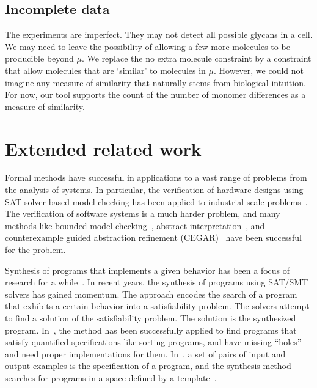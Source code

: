 \documentclass{llncs}
\begin{document}
\subsection{Incomplete data}

The experiments are imperfect. They may not detect all possible glycans
in a cell.
We may need to leave the possibility of allowing a few more molecules to be
producible beyond $\mu$.
We replace the no extra molecule constraint by a constraint that allow molecules
that are `similar' to molecules in $\mu$.
However, we could not imagine any measure of similarity that naturally stems from
biological intuition.
For now, our tool supports the count of the number of monomer differences
as a measure of similarity.



\section{Extended related work}


Formal methods have successful in applications to a vast range of
problems from the analysis of systems.
%
In particular,
the verification of hardware designs
using SAT solver based model-checking has been applied
to industrial-scale problems~\cite{biere1999symbolic2}.
%
The verification of software systems is a much harder problem, and
many methods like bounded model-checking~\cite{biere2003bounded},
abstract interpretation~\cite{lattice77}, and
counterexample guided abstraction refinement (CEGAR)~\cite{ClarkeCEGAR} have
been successful for the problem.
%

Synthesis of programs that implements a given behavior
has been a focus of research for a while~\cite{PnueliSynthesis}.
%
In recent years, the synthesis of programs using SAT/SMT solvers
has gained momentum.
%
The approach encodes the search of a program that exhibits a certain
behavior into a satisfiability problem.
%
The solvers attempt to find a solution of the satisfiability problem.
%
The solution is the synthesized program.
%
In~\cite{SrivastavaSynthesis,Solar-Lezama2005},
the method has been successfully applied
to find programs that satisfy quantified specifications like sorting
programs, and have missing ``holes'' and need proper implementations
for them.
%
In~\cite{exampleSynth},
a set of pairs of input and output examples is the specification of a program,
and the synthesis method searches for programs in a space defined by a
template~\cite{sygus}.
\end{document}
